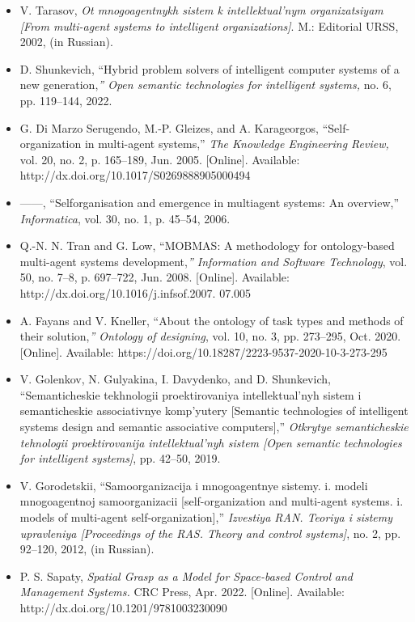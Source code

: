 \documentclass {article}
\begin{document}
\begin{multicols}{2}
\begin{itemize}
{ontological design, production and operation of semantically
compatible hybrid intelligent computer systems],} V. Golenkov,
Ed. Minsk: Bestprint [Bestprint], 2021
\renewcommand{\labelitemi}{[10]}
\item  V. Tarasov,\textit{ Ot mnogoagentnykh sistem k intellektual’nym
organizatsiyam [From multi-agent systems to intelligent
organizations]}. M.: Editorial URSS, 2002, (in Russian).
\renewcommand{\labelitemi}{[11]}
\item D. Shunkevich, “Hybrid problem solvers of intelligent computer
systems of a new generation,\textit{” Open semantic technologies for
intelligent systems,} no. 6, pp. 119–144, 2022.
\renewcommand{\labelitemi}{[12]}
\item G. Di Marzo Serugendo, M.-P. Gleizes, and A. Karageorgos,
“Self-organization in multi-agent systems,”\textit{ The Knowledge Engineering Review,} vol. 20, no. 2, p. 165–189, Jun. 2005. [Online].
Available: http://dx.doi.org/10.1017/S0269888905000494
\renewcommand{\labelitemi}{[13]}
\item   ——, “Selforganisation and emergence in multiagent systems: An
overview,” \textit{Informatica}, vol. 30, no. 1, p. 45–54, 2006.
\renewcommand{\labelitemi}{[14]}
\item Q.-N. N. Tran and G. Low, “MOBMAS: A methodology for
ontology-based multi-agent systems development,\textit{” Information
and Software Technology}, vol. 50, no. 7–8, p. 697–722, Jun.
2008. [Online]. Available: http://dx.doi.org/10.1016/j.infsof.2007.
07.005
\renewcommand{\labelitemi}{[15]}
\item
A. Fayans and V. Kneller, “About the ontology of task
types and methods of their solution,\textit{” Ontology of designing},
vol. 10, no. 3, pp. 273–295, Oct. 2020. [Online]. Available:
https://doi.org/10.18287/2223-9537-2020-10-3-273-295
\renewcommand{\labelitemi}{[16]}
\item
V. Golenkov, N. Gulyakina, I. Davydenko, and D. Shunkevich,
“Semanticheskie tekhnologii proektirovaniya intellektual’nyh
sistem i semanticheskie associativnye komp’yutery [Semantic
technologies of intelligent systems design and semantic
associative computers],”\textit{ Otkrytye semanticheskie tehnologii
proektirovanija intellektual’nyh sistem [Open semantic
technologies for intelligent systems]}, pp. 42–50, 2019.
\renewcommand{\labelitemi}{[17]}
\item
V. Gorodetskii, “Samoorganizacija i mnogoagentnye sistemy. i.
modeli mnogoagentnoj samoorganizacii [self-organization and
multi-agent systems. i. models of multi-agent self-organization],”
\textit{Izvestiya RAN. Teoriya i sistemy upravleniya [Proceedings of the RAS. Theory and control systems]}, no. 2, pp. 92–120, 2012, (in
Russian).
\renewcommand{\labelitemi}{[18]}
\item P. S. Sapaty,\textit{ Spatial Grasp as a Model for Space-based Control}
\newpage
    \textit{and Management Systems.} CRC Press, Apr. 2022. [Online].
Available: http://dx.doi.org/10.1201/9781003230090


\end{itemize}
\end{multicols}
\end{document}
